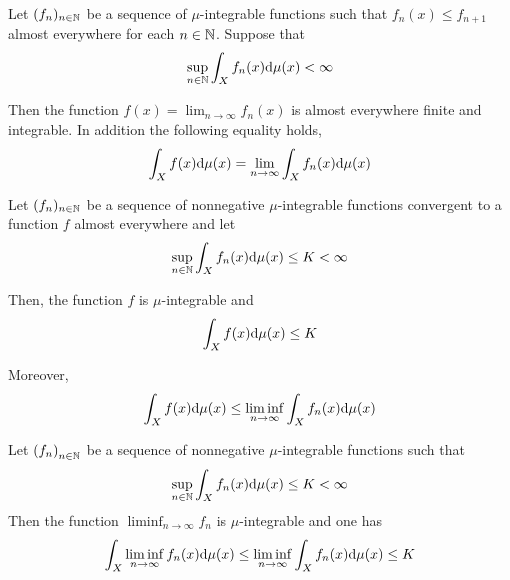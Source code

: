 \begin{theorem}
	Let $(f_n)_{n\in \mathbb{N}}$ be a sequence of $\mu$-integrable functions such that $f_n(x) \leq f_{n+1}$ almost everywhere for each $n \in \mathbb{N}$. Suppose that
	\begin{equation}
	\sup_{n\in \mathbb{N}}\int_X f_n(x)\mathrm{d}\mu(x) < \infty
	\end{equation}
	
	Then the function $f(x)=\lim_{n\rightarrow\infty} f_n(x)$ is almost everywhere finite and integrable. In addition the following equality holds,
	\begin{equation*}
		\int_X f(x)\mathrm{d}\mu(x) = \lim_{n\rightarrow\infty} \int_X f_n(x)\mathrm{d}\mu(x)	
	\end{equation*}
\end{theorem}

\begin{theorem}
	Let $(f_n)_{n\in \mathbb{N}}$ be a sequence of nonnegative $\mu$-integrable functions convergent to a function $f$ almost everywhere and let
	\begin{equation*}
		\sup_{n\in \mathbb{N}} \int_X f_n(x)\mathrm{d}\mu(x)\leq K <\infty
	\end{equation*}
	
	Then, the function $f$ is $\mu$-integrable and 
	\begin{equation*}
		\int_X f(x)\mathrm{d}\mu(x) \leq K
	\end{equation*}
	
	Moreover, 
	\begin{equation*}
		\int_X f(x)\mathrm{d}\mu(x)\leq \liminf_{n\rightarrow\infty} \int_{X} f_n (x)\mathrm{d}\mu(x)
	\end{equation*}
\end{theorem}

\begin{corollary}
	Let $\left( f_n \right)_{n\in \mathbb{N}}$ be a sequence of nonnegative $\mu$-integrable functions such that 
	\begin{equation*}
		\sup_{n\in \mathbb{N}}\int_{X} f_n(x)\mathrm{d}\mu(x) \leq K < \infty
	\end{equation*}
	Then the function $\liminf_{n\rightarrow \infty} f_n$ is $\mu$-integrable and one has 
	\begin{equation}
		\int_X \liminf_{n\rightarrow\infty}f_n(x)\mathrm{d}\mu(x)\leq \liminf_{n\rightarrow \infty} \int_X f_n(x)\mathrm{d}\mu(x) \leq K
	\end{equation}
\end{corollary}

